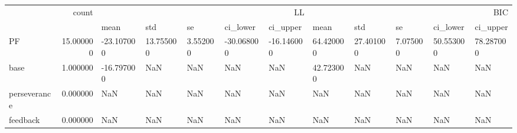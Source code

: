 \begin{tabular}{lrllllllllll}
\toprule
 & count & \multicolumn{5}{r}{LL} & \multicolumn{5}{r}{BIC} \\
 &  & mean & std & se & ci_lower & ci_upper & mean & std & se & ci_lower & ci_upper \\
\midrule
PF & 15.000000 & -23.107000 & 13.755000 & 3.552000 & -30.068000 & -16.146000 & 64.420000 & 27.401000 & 7.075000 & 50.553000 & 78.287000 \\
base & 1.000000 & -16.797000 & NaN & NaN & NaN & NaN & 42.723000 & NaN & NaN & NaN & NaN \\
perseverance & 0.000000 & NaN & NaN & NaN & NaN & NaN & NaN & NaN & NaN & NaN & NaN \\
feedback & 0.000000 & NaN & NaN & NaN & NaN & NaN & NaN & NaN & NaN & NaN & NaN \\
\bottomrule
\end{tabular}
